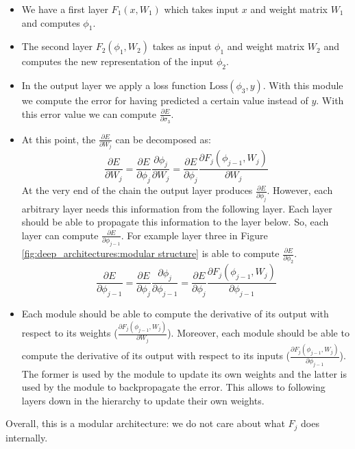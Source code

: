 \begin{itemize}
    \item We have a first layer $F_1(x, W_1)$ which takes input $x$ and weight matrix $W_1$ and computes $\phi_1$.
    
    \item The second layer $F_2(\phi_1, W_2)$ takes as input $\phi_1$ and weight matrix $W_2$ and computes the new representation of the input $\phi_2$.
    
    \item In the output layer we apply a loss function $\text{Loss}(\phi_3, y)$. With this module we compute the error for having predicted a certain value instead of $y$. With this error value we can compute $\frac{\partial E}{\partial \sigma_3}$.
    
    \item At this point, the $\frac{\partial E}{\partial W_j}$ can be decomposed as:
    $$\frac{\partial E}{\partial W_j} = \frac{\partial E}{\partial \phi_j} \frac{\partial \phi_j}{\partial W_j} = \frac{\partial E}{\partial \phi_j} \frac{\partial F_j(\phi_{j-1}, W_j)}{\partial W_j}$$
    At the very end of the chain the output layer produces $\frac{\partial E}{\partial \phi_j}$. However, each arbitrary layer needs this information from the following layer. Each layer should be able to propagate this information to the layer below. So, each layer can compute $\frac{\partial E}{\partial \phi_{j-1}}$. For example layer three in Figure \ref{fig:deep_architectures:modular structure} is able to compute $\frac{\partial E}{\partial \phi_{2}}$.
    $$\frac{\partial E}{\partial \phi_{j-1}} = \frac{\partial E}{\partial \phi_{j}} \frac{\partial \phi_j}{\partial \phi_{j-1}} = \frac{\partial E}{\partial \phi_{j}} \frac{\partial F_j(\phi_{j-1}, W_j)}{\partial \phi_{j-1}}$$
    
    \item Each module should be able to compute the derivative of its output with respect to its weights ($\frac{\partial F_j(\phi_{j-1}, W_j)}{\partial W_j}$). Moreover, each module should be able to compute the derivative of its output with respect to its inputs ($\frac{\partial F_j(\phi_{j-1}, W_j)}{\partial \phi_{j-1}}$). The former is used by the module to update its own weights and the latter is used by the module to backpropagate the error. This allows to following layers down in the hierarchy to update their own weights.
\end{itemize}

Overall, this is a modular architecture: we do not care about what $F_j$ does internally. \newline

